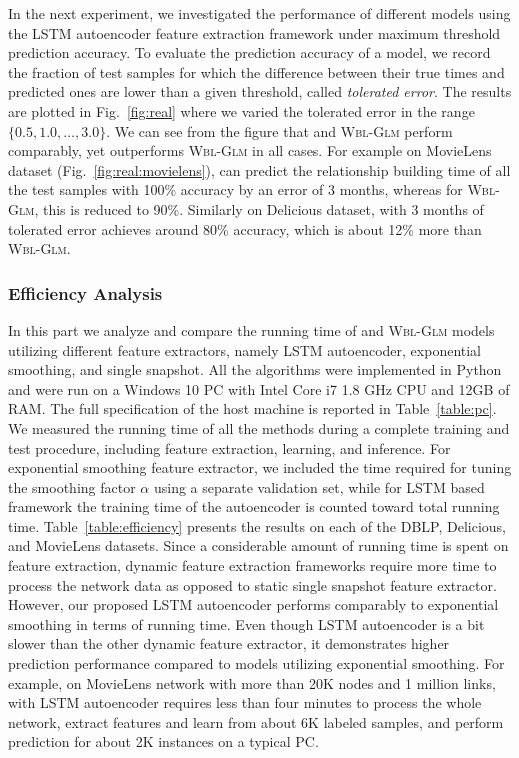 In the next experiment, we investigated the performance of different models using the LSTM autoencoder feature extraction framework under maximum threshold prediction accuracy. To evaluate the prediction accuracy of a model, we record the fraction of test samples for which the difference between their true times and predicted ones are lower than a given threshold, called \emph{tolerated error}. The results are plotted in Fig.~\ref{fig:real} where we varied the tolerated error in the range $\{0.5, 1.0, \dots, 3.0\}$. We can see from the figure that \npglm and \textsc{Wbl-Glm} perform comparably, yet \npglm outperforms \textsc{Wbl-Glm} in all cases. For example on MovieLens dataset (Fig.~\ref{fig:real:movielens}), \npglm can predict the relationship building time of all the test samples with 100\% accuracy by an error of 3 months, whereas for \textsc{Wbl-Glm}, this is reduced to 90\%. Similarly on Delicious dataset, \npglm with 3 months of tolerated error achieves around 80\% accuracy, which is about 12\% more than \textsc{Wbl-Glm}.

{\color{red}
\subsubsection{Efficiency Analysis}
In this part we analyze and compare the running time of \npglm and \textsc{Wbl-Glm} models utilizing different feature extractors, namely LSTM autoencoder, exponential smoothing, and single snapshot. All the algorithms were implemented in Python and were run on a Windows 10 PC with Intel Core i7 1.8 GHz CPU and 12GB of RAM. The full specification of the host machine is reported in Table~\ref{table:pc}. We measured the running time of all the methods during a complete training and test procedure, including feature extraction, learning, and inference. For exponential smoothing feature extractor, we included the time required for tuning the smoothing factor $\alpha$ using a separate validation set, while for LSTM based framework the training time of the autoencoder is counted toward total running time. Table~\ref{table:efficiency} presents the results on each of the DBLP, Delicious, and MovieLens datasets. Since a considerable amount of running time is spent on feature extraction, dynamic feature extraction frameworks require more time to process the network data as opposed to static single snapshot feature extractor. However, our proposed LSTM autoencoder performs comparably to exponential smoothing in terms of running time. Even though LSTM autoencoder is a bit slower than the other dynamic feature extractor, it demonstrates higher prediction performance compared to models utilizing exponential smoothing. For example, on MovieLens network with more than 20K nodes and 1 million links, \npglm with LSTM autoencoder requires less than four minutes to process the whole network, extract features and learn from about 6K labeled samples, and perform prediction for about 2K instances on a typical PC.
}

